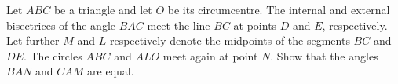Let $ABC$ be a triangle and let $O$ be its circumcentre. The internal and external bisectrices of the angle $BAC$ meet the line $BC$ at points $D$ and $E$, respectively. Let further $M$ and $L$ respectively denote the midpoints of the  segments $BC$ and $DE$. The circles $ABC$ and $ALO$ meet again at point $N$. Show that the angles $BAN$ and $CAM$ are equal.